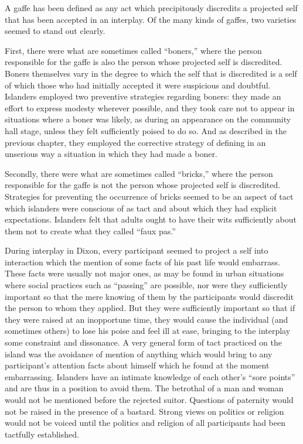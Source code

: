 \documentclass[openany,nobib]{tufte-book}
\begin{document}
A gaffe has been defined as any act which precipitously discredits a
projected self that has been accepted in an interplay. Of the many kinds
of gaffes, two varieties seemed to stand out clearly.

First, there were what are sometimes called ``boners,'' where the person
responsible for the gaffe is also the person whose projected self is
discredited. Boners themselves vary in the degree to which the self that
is discredited is a self of which those who had initially accepted it
were suspicious and doubtful. Islanders employed two preventive
strategies regarding boners: they made an effort to express modesty
wherever possible, and they took care not to appear in situations where
a boner was likely, as during an appearance on the community hall stage,
unless they felt sufficiently poised to do so. And as described in the
previous chapter, they employed the corrective strategy of defining in
an unserious way a situation in which they had made a boner.

Secondly, there were what are sometimes called ``bricks,'' where the
person responsible for the gaffe is not the person whose projected self
is discredited. Strategies for preventing the occurrence of bricks
seemed to be an aspect of tact which islanders were conscious of as tact
and about which they had explicit expectations. Islanders felt that
adults ought to have their wits sufficiently about them not to create
what they called ``faux pas.''

During interplay in Dixon, every participant seemed to project a self
into interaction which the mention of some facts of his past life would
embarrass. These facts were usually not major ones, as may be found in
urban situations where social practices such as ``passing'' are
possible, nor were they sufficiently important so that the mere knowing
of them by the participants would discredit the person to whom they
applied. But they were sufficiently important so that if they were
raised at an inopportune time, they would cause the individual (and
sometimes others) to lose his poise and feel ill at ease, bringing to
the interplay some constraint and dissonance. A very general form of
tact practiced on the island was the avoidance of mention of anything
which would bring to any participant's attention facts about himself
which he found at the moment embarrassing. Islanders have an intimate
knowledge of each other's ``sore points'' and are thus in a position to
avoid them. The betrothal of a man and woman would not be mentioned
before the rejected suitor. Questions of paternity would not be raised
in the presence of a bastard. Strong views on politics or religion would
not be voiced until the politics and religion of all participants had
been tactfully established.
\end{document}
